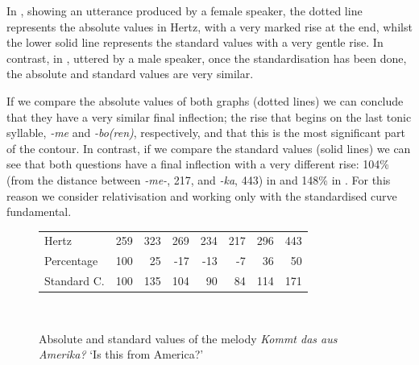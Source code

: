 \documentclass[output=paper]{langscibook}
\begin{document}
In , showing an utterance produced by a female speaker, the dotted line represents the absolute values in Hertz, with a very marked rise at the end, whilst the lower solid line represents the standard values with a very gentle rise. In contrast, in , uttered by a male speaker, once the standardisation has been done, the absolute and standard values are very similar. 
 
If we compare the absolute values of both graphs (dotted lines) we can conclude that they have a very similar final inflection; the rise that begins on the last tonic syllable, \textit{-me} and \textit{-bo(ren)}, respectively, and that this is the most significant part of the contour.  In contrast, if we compare the standard values (solid lines) we can see that both questions have a final inflection with a very different rise: 104\% (from the distance between \textit{-me-}, 217, and \textit{-ka}, 443) in  and 148\% in . For this reason we consider relativisation and working only with the standardised curve fundamental.

\begin{figure}
\begin{tabular}{lrrrrrrr}
  \midrule
 Hertz     & 259 & 323 & 269 & 234 & 217 & 296 & 443 \\
 Percentage  & 100 & 25 & -17 & -13 & -7 & 36 & 50 \\ 
 Standard C. & 100 & 135 & 104 & 90 & 84 & 114 & 171\\
\end{tabular}~~~~~

\caption{Absolute and standard values of the melody \textit{Kommt das aus Amerika?} ‘Is this from America?’}
\label{graph:font:1}
\end{figure}
\end{document}
